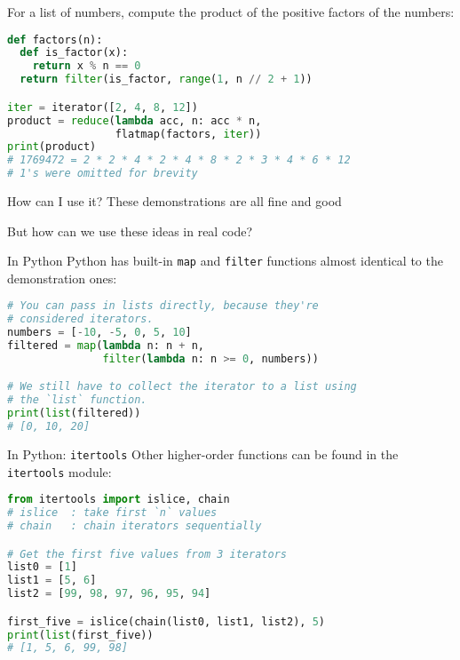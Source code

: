 \documentclass[../index.tex]{subfiles}
\begin{document}
\begin{frame}[fragile]{\currenttitle}
For a list of numbers, compute the product of the positive factors of the
numbers: \\[1em]

  \begin{lstlisting}[language=Python]
def factors(n):
  def is_factor(x):
    return x % n == 0
  return filter(is_factor, range(1, n // 2 + 1))

iter = iterator([2, 4, 8, 12])
product = reduce(lambda acc, n: acc * n,
                 flatmap(factors, iter))
print(product)
# 1769472 = 2 * 2 * 4 * 2 * 4 * 8 * 2 * 3 * 4 * 6 * 12
# 1's were omitted for brevity

  \end{lstlisting}
\end{frame}

\renewcommand{\currenttitle}{How can I use it?}
\begin{frame}[fragile]{\currenttitle}
  These demonstrations are all fine and good

  But how can we use these ideas in real code?
\end{frame}

\renewcommand{\currenttitle}{In Python}
\begin{frame}[fragile]{\currenttitle}
  Python has built-in \texttt{map} and \texttt{filter} functions almost
  identical to the demonstration ones:

  \begin{lstlisting}[language=Python]
# You can pass in lists directly, because they're
# considered iterators.
numbers = [-10, -5, 0, 5, 10]
filtered = map(lambda n: n + n,
               filter(lambda n: n >= 0, numbers))

# We still have to collect the iterator to a list using
# the `list` function.
print(list(filtered))
# [0, 10, 20]
  \end{lstlisting}
\end{frame}

\renewcommand{\currenttitle}{In Python: \texttt{itertools}}
\begin{frame}[fragile]{\currenttitle}
  Other higher-order functions can be found in the \texttt{itertools} module:

  \begin{lstlisting}[language=Python]
from itertools import islice, chain
# islice  : take first `n` values 
# chain   : chain iterators sequentially

# Get the first five values from 3 iterators
list0 = [1]
list1 = [5, 6]
list2 = [99, 98, 97, 96, 95, 94]

first_five = islice(chain(list0, list1, list2), 5)
print(list(first_five))
# [1, 5, 6, 99, 98]
  \end{lstlisting}
\end{frame}
\end{document}
